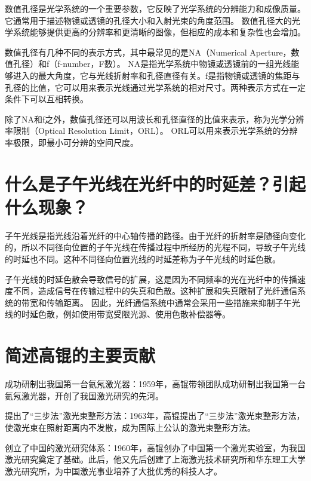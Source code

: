 \documentclass[12pt, a4paper, oneside]{article}
\begin{document}
\begin{spacing}{2.0}
数值孔径是光学系统的一个重要参数，它反映了光学系统的分辨能力和成像质量。它通常用于描述物镜或透镜的孔径大小和入射光束的角度范围。
数值孔径大的光学系统能够提供更高的分辨率和更清晰的图像，但相应的成本和复杂性也会增加。

数值孔径有几种不同的表示方式，其中最常见的是NA（Numerical Aperture，数值孔径）和f（f-number，F数）。
NA是指光学系统中物镜或透镜前的一组光线能够进入的最大角度，它与光线折射率和孔径直径有关。f是指物镜或透镜的焦距与孔径的比值，它可以用来表示光线通过光学系统的相对尺寸。两种表示方式在一定条件下可以互相转换。

除了NA和f之外，数值孔径还可以用波长和孔径直径的比值来表示，称为光学分辨率限制（Optical Resolution Limit，ORL）。
ORL可以用来表示光学系统的分辨率极限，即最小可分辨的空间尺度。


\section{什么是子午光线在光纤中的时延差？引起什么现象？ }
子午光线是指光线沿着光纤的中心轴传播的路径。由于光纤的折射率是随径向变化的，所以不同径向位置的子午光线在传播过程中所经历的光程不同，导致子午光线的时延也不同。这种不同径向位置光线的时延差称为子午光线的时延色散。

子午光线的时延色散会导致信号的扩展，这是因为不同频率的光在光纤中的传播速度不同，造成信号在传输过程中的失真和色散。这种扩展和失真限制了光纤通信系统的带宽和传输距离。
因此，光纤通信系统中通常会采用一些措施来抑制子午光线的时延色散，例如使用带宽受限光源、使用色散补偿器等。
\section{简述高锟的主要贡献 }

成功研制出我国第一台氦氖激光器：1959年，高锟带领团队成功研制出我国第一台氦氖激光器，开创了我国激光研究的先河。

提出了“三步法”激光束整形方法：1963年，高锟提出了“三步法”激光束整形方法，使激光束在照射距离内不发散，成为国际上公认的激光束整形方法。

创立了中国的激光研究体系：1960年，高锟创办了中国第一个激光实验室，为我国激光研究奠定了基础。此后，他又先后创建了上海激光技术研究所和华东理工大学激光研究所，为中国激光事业培养了大批优秀的科技人才。



\end{spacing}
\end{document}
